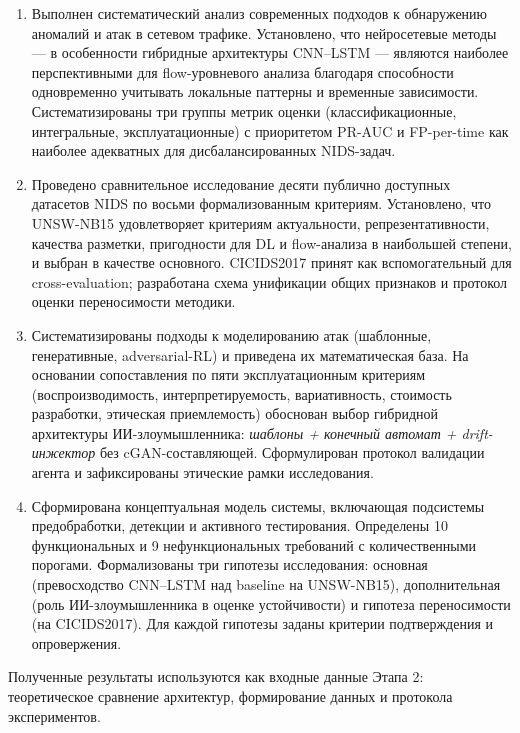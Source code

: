 \documentclass[14pt, a4paper]{extarticle}
\begin{document}
\begin{enumerate}
    \item Выполнен систематический анализ современных подходов к
    обнаружению аномалий и атак в сетевом трафике. Установлено, что
    нейросетевые методы --- в особенности гибридные архитектуры
    CNN--LSTM --- являются наиболее перспективными для flow-уровневого
    анализа благодаря способности одновременно учитывать локальные
    паттерны и временные зависимости. Систематизированы три группы
    метрик оценки (классификационные, интегральные, эксплуатационные)
    с приоритетом PR-AUC и FP-per-time как наиболее адекватных для
    дисбалансированных NIDS-задач.
    \item Проведено сравнительное исследование десяти публично доступных
    датасетов NIDS по восьми формализованным критериям. Установлено, что
    UNSW-NB15 удовлетворяет критериям актуальности, репрезентативности,
    качества разметки, пригодности для DL и flow-анализа в наибольшей
    степени, и выбран в качестве основного. CICIDS2017 принят как
    вспомогательный для cross-evaluation; разработана схема унификации
    общих признаков и протокол оценки переносимости методики.
    \item Систематизированы подходы к моделированию атак (шаблонные,
    генеративные, adversarial-RL) и приведена их математическая база.
    На основании сопоставления по пяти эксплуатационным критериям
    (воспроизводимость, интерпретируемость, вариативность, стоимость
    разработки, этическая приемлемость) обоснован выбор гибридной
    архитектуры ИИ-злоумышленника: \emph{шаблоны + конечный автомат +
    drift-инжектор} без cGAN-составляющей. Сформулирован протокол
    валидации агента и зафиксированы этические рамки исследования.
    \item Сформирована концептуальная модель системы, включающая
    подсистемы предобработки, детекции и активного тестирования.
    Определены 10 функциональных и 9 нефункциональных требований с
    количественными порогами. Формализованы три гипотезы исследования:
    основная (превосходство CNN--LSTM над baseline на UNSW-NB15),
    дополнительная (роль ИИ-злоумышленника в оценке устойчивости) и
    гипотеза переносимости (на CICIDS2017). Для каждой гипотезы заданы
    критерии подтверждения и опровержения.
\end{enumerate}

Полученные результаты используются как входные данные Этапа 2:
теоретическое сравнение архитектур, формирование данных и протокола
экспериментов.

\label{lastfig}
\label{lasttab}
\label{lastref}

\printbibliography[title={СПИСОК ИСПОЛЬЗОВАННЫХ ИСТОЧНИКОВ}]

\label{LastPage}
\end{document}
